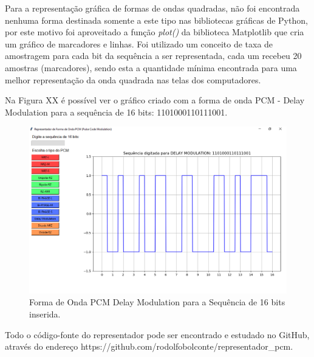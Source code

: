 \documentclass[journal]{IEEEtran}
\begin{document}
Para a representação gráfica de formas de ondas quadradas, não foi encontrada nenhuma forma destinada somente a este tipo nas bibliotecas gráficas de Python, por este motivo foi aproveitado a função \textit{plot()} da biblioteca Matplotlib que cria um gráfico de marcadores e linhas. Foi utilizado um conceito de taxa de amostragem para cada bit da sequência a ser representada, cada um recebeu 20 amostras (marcadores), sendo esta a quantidade mínima encontrada para uma melhor representação da onda quadrada nas telas dos computadores.

Na Figura XX é possível ver o gráfico criado com a forma de onda PCM - Delay Modulation para a sequência de 16 bits: 1101000110111001.

\begin{figure}[!ht]
    \centering
    \includegraphics[width=\linewidth]{interface_resultado.png}
    \caption{Forma de Onda PCM Delay Modulation para a Sequência de 16 bits inserida.}
\end{figure}

Todo o código-fonte do representador pode ser encontrado e estudado no GitHub, através do endereço https://github.com/rodolfobolconte/representador\_pcm.




\end{document}

